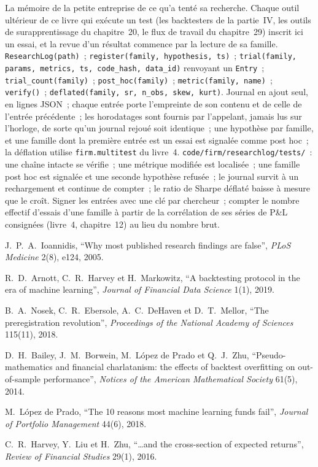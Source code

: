 \begin{build}
 La mémoire de la petite entreprise de ce qu'a tenté sa recherche. Chaque outil ultérieur de ce livre qui exécute un test
(les backtesters de la partie~IV, les outils de surapprentissage du chapitre~20, le flux de travail du chapitre~29) inscrit ici un essai, et la
revue d'un résultat commence par la lecture de sa famille.
 \texttt{ResearchLog(path)}~; \texttt{register(family, hypothesis, ts)}~;
\texttt{trial(family, params, metrics, ts, code\_hash, data\_id)} renvoyant un \texttt{Entry}~; \texttt{trial\_count(family)}~;
\texttt{post\_hoc(family)}~; \texttt{metric(family, name)}~; \texttt{verify()}~; \texttt{deflated(family, sr, n\_obs, skew, kurt)}.
 Journal en ajout seul, en lignes JSON~; chaque entrée porte l'empreinte de son contenu et de celle de l'entrée précédente~; les horodatages sont
fournis par l'appelant, jamais lus sur l'horloge, de sorte qu'un journal rejoué soit identique~; une hypothèse par famille, et une famille
dont la première entrée est un essai est signalée comme post hoc~; la déflation utilise \texttt{firm.multitest} du livre~4.
 \texttt{code/firm/researchlog/tests/}~: une chaîne intacte se vérifie~; une métrique modifiée est localisée~; une famille
post hoc est signalée et une seconde hypothèse refusée~; le journal survit à un rechargement et continue de compter~; le ratio de Sharpe déflaté
baisse à mesure que le  croît.
 Signer les entrées avec une clé par chercheur~; compter le nombre effectif d'essais d'une famille à partir de la
corrélation de ses séries de P\&L consignées (livre~4, chapitre~12) au lieu du nombre brut.
\end{build}

\begin{omsources}
\item J.~P.~A.~Ioannidis, ``Why most published research findings are false'', \emph{PLoS Medicine} 2(8), e124, 2005.
\item R.~D.~Arnott, C.~R.~Harvey et H.~Markowitz, ``A backtesting protocol in the era of machine learning'', \emph{Journal of
Financial Data Science} 1(1), 2019.
\item B.~A.~Nosek, C.~R.~Ebersole, A.~C.~DeHaven et D.~T.~Mellor, ``The preregistration revolution'', \emph{Proceedings of the
National Academy of Sciences} 115(11), 2018.
\item D.~H.~Bailey, J.~M.~Borwein, M.~López de Prado et Q.~J.~Zhu, ``Pseudo-mathematics and financial charlatanism: the effects
of backtest overfitting on out-of-sample performance'', \emph{Notices of the American Mathematical Society} 61(5), 2014.
\item M.~López de Prado, ``The 10 reasons most machine learning funds fail'', \emph{Journal of Portfolio Management} 44(6), 2018.
\item C.~R.~Harvey, Y.~Liu et H.~Zhu, ``\dots and the cross-section of expected returns'', \emph{Review of Financial Studies}
29(1), 2016.
\end{omsources}

